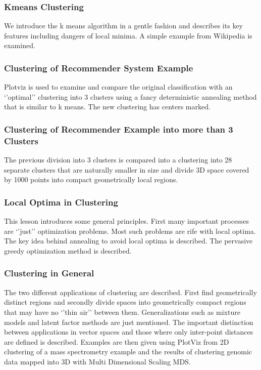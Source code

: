 \subsubsection{Kmeans Clustering}\label{kmeans-clustering}

We introduce the k means algorithm in a gentle fashion and describes its
key features including dangers of local minima. A simple example from
Wikipedia is examined.

\subsubsection{Clustering of Recommender System
Example}\label{clustering-of-recommender-system-example}

Plotviz is used to examine and compare the original classification with
an `'optimal'' clustering into 3 clusters using a fancy deterministic
annealing method that is similar to k means. The new clustering has
centers marked.

\subsubsection{Clustering of Recommender Example into more than 3
Clusters}\label{clustering-of-recommender-example-into-more-than-3-clusters}

The previous division into 3 clusters is compared into a clustering into
28 separate clusters that are naturally smaller in size and divide 3D
space covered by 1000 points into compact geometrically local regions.

\subsubsection{Local Optima in
Clustering}\label{local-optima-in-clustering}

This lesson introduces some general principles. First many important
processes are `'just'' optimization problems. Most such problems are
rife with local optima. The key idea behind annealing to avoid local
optima is described. The pervasive greedy optimization method is
described.

\subsubsection{Clustering in General}\label{clustering-in-general}

The two different applications of clustering are described. First find
geometrically distinct regions and secondly divide spaces into
geometrically compact regions that may have no `'thin air'' between
them. Generalizations such as mixture models and latent factor methods
are just mentioned. The important distinction between applications in
vector spaces and those where only inter-point distances are defined is
described. Examples are then given using PlotViz from 2D clustering of a
mass spectrometry example and the results of clustering genomic data
mapped into 3D with Multi Dimensional Scaling MDS.

